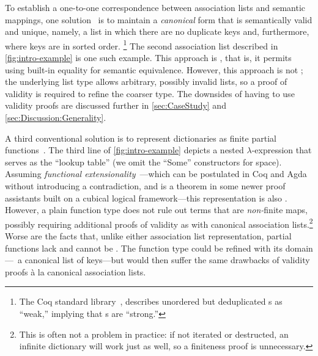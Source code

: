 To establish a one-to-one correspondence between association lists and semantic mappings, one solution~\citep{FMapList} is to maintain a \emph{canonical}
%
form that is semantically valid and unique, namely, a list in which there are no duplicate keys and, furthermore, where keys are in sorted order.%
%
\footnote{\hspace{0.01in}%
%
The Coq standard library~\citep{FMapInterface}, describes unordered but deduplicated \sal{}s as ``weak,'' implying that \cal{}s are ``strong.''
%
}
%
The second association list described in \autoref{fig:intro-example} is one such example.
%
This approach is \extensional{}, that is, it permits using built-in equality for semantic equivalence.
%
However, this approach is not \firstUseGoal{\semanticallyTotal}; the underlying list type allows arbitrary, possibly invalid lists, so a proof of validity is required to refine the coarser type.
%
%
The downsides of having to use validity proofs are discussed further in \autoref{sec:CaseStudy} and \autoref{sec:Discussion:Generality}.

A third conventional solution is to represent dictionaries as finite partial functions~\cite[Maps]{Pierce:SF1}.
%
The third line of \autoref{fig:intro-example} depicts a nested $\lambda$-expression that serves as the ``lookup table'' (we omit the ``Some'' constructors for space).
%
Assuming \emph{functional extensionality}~\mbox{\cite[Logic]{Pierce:SF1}}---which can be postulated in Coq and Agda without introducing a contradiction, and is a theorem in some newer proof assistants built on a cubical logical framework---this representation is also \extensional{}.
%
However, a plain function type does not rule out terms that are \emph{non-}finite maps, possibly requiring additional proofs of validity as with canonical association lists.\footnote{\hspace{0.01in}%
%
This is often not a problem in practice:
%
if not iterated or destructed, an infinite dictionary will work just as well,
%
so a finiteness proof is unnecessary.
%
}
%
Worse are the facts that, unlike either association list representation, partial functions lack \firstUseGoal{\DecidableEq} and cannot be \firstUseGoal{\destructed}.
%
The function type could be refined with its domain---\ie{}~a canonical list of keys---but would then suffer the same drawbacks of validity proofs \`{a} la canonical association lists.


